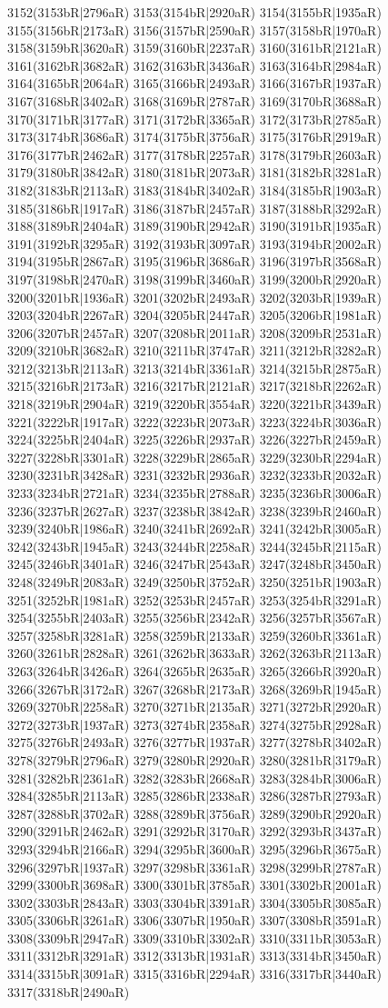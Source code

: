 3152(3153bR|2796aR) 3153(3154bR|2920aR) 3154(3155bR|1935aR) 3155(3156bR|2173aR) 3156(3157bR|2590aR) 3157(3158bR|1970aR) 3158(3159bR|3620aR) 3159(3160bR|2237aR) 3160(3161bR|2121aR) 3161(3162bR|3682aR) 3162(3163bR|3436aR) 3163(3164bR|2984aR) 3164(3165bR|2064aR) 3165(3166bR|2493aR) 3166(3167bR|1937aR) 3167(3168bR|3402aR) 3168(3169bR|2787aR) 3169(3170bR|3688aR) 3170(3171bR|3177aR) 3171(3172bR|3365aR) 3172(3173bR|2785aR) 3173(3174bR|3686aR) 3174(3175bR|3756aR) 3175(3176bR|2919aR) 3176(3177bR|2462aR) 3177(3178bR|2257aR) 3178(3179bR|2603aR) 3179(3180bR|3842aR) 3180(3181bR|2073aR) 3181(3182bR|3281aR) 3182(3183bR|2113aR) 3183(3184bR|3402aR) 3184(3185bR|1903aR) 3185(3186bR|1917aR) 3186(3187bR|2457aR) 3187(3188bR|3292aR) 3188(3189bR|2404aR) 3189(3190bR|2942aR) 3190(3191bR|1935aR) 3191(3192bR|3295aR) 3192(3193bR|3097aR) 3193(3194bR|2002aR) 3194(3195bR|2867aR) 3195(3196bR|3686aR) 3196(3197bR|3568aR) 3197(3198bR|2470aR) 3198(3199bR|3460aR) 3199(3200bR|2920aR) 3200(3201bR|1936aR) 3201(3202bR|2493aR) 3202(3203bR|1939aR) 3203(3204bR|2267aR) 3204(3205bR|2447aR) 3205(3206bR|1981aR) 3206(3207bR|2457aR) 3207(3208bR|2011aR) 3208(3209bR|2531aR) 3209(3210bR|3682aR) 3210(3211bR|3747aR) 3211(3212bR|3282aR) 3212(3213bR|2113aR) 3213(3214bR|3361aR) 3214(3215bR|2875aR) 3215(3216bR|2173aR) 3216(3217bR|2121aR) 3217(3218bR|2262aR) 3218(3219bR|2904aR) 3219(3220bR|3554aR) 3220(3221bR|3439aR) 3221(3222bR|1917aR) 3222(3223bR|2073aR) 3223(3224bR|3036aR) 3224(3225bR|2404aR) 3225(3226bR|2937aR) 3226(3227bR|2459aR) 3227(3228bR|3301aR) 3228(3229bR|2865aR) 3229(3230bR|2294aR) 3230(3231bR|3428aR) 3231(3232bR|2936aR) 3232(3233bR|2032aR) 3233(3234bR|2721aR) 3234(3235bR|2788aR) 3235(3236bR|3006aR) 3236(3237bR|2627aR) 3237(3238bR|3842aR) 3238(3239bR|2460aR) 3239(3240bR|1986aR) 3240(3241bR|2692aR) 3241(3242bR|3005aR) 3242(3243bR|1945aR) 3243(3244bR|2258aR) 3244(3245bR|2115aR) 3245(3246bR|3401aR) 3246(3247bR|2543aR) 3247(3248bR|3450aR) 3248(3249bR|2083aR) 3249(3250bR|3752aR) 3250(3251bR|1903aR) 3251(3252bR|1981aR) 3252(3253bR|2457aR) 3253(3254bR|3291aR) 3254(3255bR|2403aR) 3255(3256bR|2342aR) 3256(3257bR|3567aR) 3257(3258bR|3281aR) 3258(3259bR|2133aR) 3259(3260bR|3361aR) 3260(3261bR|2828aR) 3261(3262bR|3633aR) 3262(3263bR|2113aR) 3263(3264bR|3426aR) 3264(3265bR|2635aR) 3265(3266bR|3920aR) 3266(3267bR|3172aR) 3267(3268bR|2173aR) 3268(3269bR|1945aR) 3269(3270bR|2258aR) 3270(3271bR|2135aR) 3271(3272bR|2920aR) 3272(3273bR|1937aR) 3273(3274bR|2358aR) 3274(3275bR|2928aR) 3275(3276bR|2493aR) 3276(3277bR|1937aR) 3277(3278bR|3402aR) 3278(3279bR|2796aR) 3279(3280bR|2920aR) 3280(3281bR|3179aR) 3281(3282bR|2361aR) 3282(3283bR|2668aR) 3283(3284bR|3006aR) 3284(3285bR|2113aR) 3285(3286bR|2338aR) 3286(3287bR|2793aR) 3287(3288bR|3702aR) 3288(3289bR|3756aR) 3289(3290bR|2920aR) 3290(3291bR|2462aR) 3291(3292bR|3170aR) 3292(3293bR|3437aR) 3293(3294bR|2166aR) 3294(3295bR|3600aR) 3295(3296bR|3675aR) 3296(3297bR|1937aR) 3297(3298bR|3361aR) 3298(3299bR|2787aR) 3299(3300bR|3698aR) 3300(3301bR|3785aR) 3301(3302bR|2001aR) 3302(3303bR|2843aR) 3303(3304bR|3391aR) 3304(3305bR|3085aR) 3305(3306bR|3261aR) 3306(3307bR|1950aR) 3307(3308bR|3591aR) 3308(3309bR|2947aR) 3309(3310bR|3302aR) 3310(3311bR|3053aR) 3311(3312bR|3291aR) 3312(3313bR|1931aR) 3313(3314bR|3450aR) 3314(3315bR|3091aR) 3315(3316bR|2294aR) 3316(3317bR|3440aR) 3317(3318bR|2490aR) 